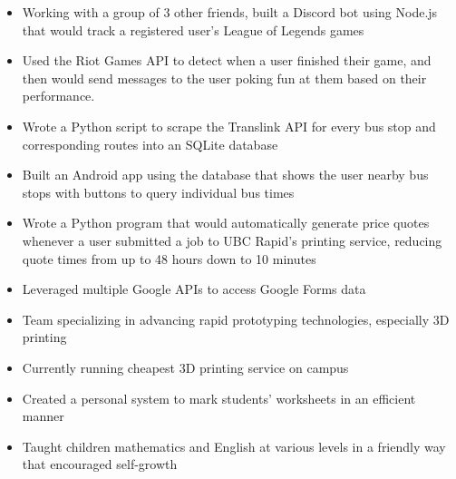 \documentclass{resume}
\begin{document}
\begin{itemize}
	\item Working with a group of 3 other friends, built a Discord bot using Node.js that would track a registered user's League of Legends games
	\item Used the Riot Games API to detect when a user finished their game, and then would send messages to the user poking fun at them based on their performance.
\end{itemize}

\begin{itemize}
	\item Wrote a Python script to scrape the Translink API for every bus stop and corresponding routes into an SQLite database
	\item Built an Android app using the database that shows the user nearby bus stops with buttons to query individual bus times
\end{itemize}

\begin{itemize}
	\item Wrote a Python program that would automatically generate price quotes whenever a user submitted a job to UBC Rapid's printing service, reducing quote times from up to 48 hours down to 10 minutes
	\item Leveraged multiple Google APIs to access Google Forms data
\end{itemize}

\StudentTeams

\begin{itemize}
	\item Team specializing in advancing rapid prototyping technologies, especially 3D printing
	\item Currently running cheapest 3D printing service on campus
\end{itemize}

\OtherWorkExperience

\begin{itemize}
	\item Created a personal system to mark students' worksheets in an efficient manner
	\item Taught children mathematics and English at various levels in a friendly way that encouraged self-growth
\end{itemize}
\end{document}
